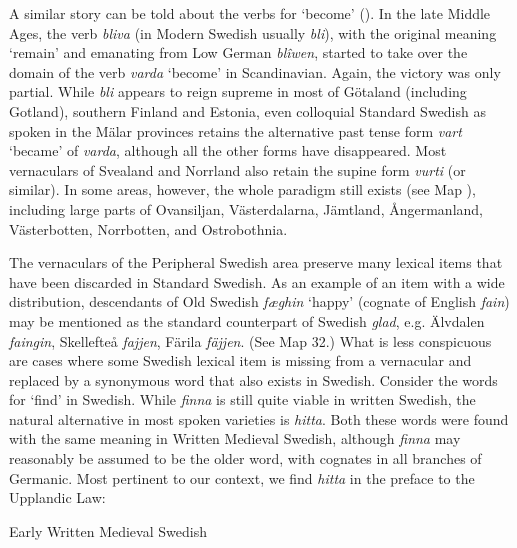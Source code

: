 \begin{styleBodytextC}
A similar story can be told about the verbs for ‘become’ (\citet{Markey1969}). In the late Middle Ages, the verb \textit{bliva }(in Modern Swedish usually \textit{bli}), with the original meaning ‘remain’ and emanating from Low German \textit{blîwen}, started to take over the domain of the verb \textit{varda} ‘become’ in Scandinavian. Again, the victory was only partial. While \textit{bli }appears to reign supreme in most of Götaland (including Gotland), southern Finland and Estonia, even colloquial Standard Swedish as spoken in the Mälar provinces retains the alternative past tense form \textit{vart} ‘became’ of \textit{varda}, although all the other forms have disappeared. Most vernaculars of Svealand and Norrland also retain the supine form \textit{vurti} (or similar). In some areas, however, the whole paradigm still exists (see Map ), including large parts of Ovansiljan, Västerdalarna, Jämtland, Ångermanland, Västerbotten, Norrbotten, and Ostrobothnia.

\end{styleBodytextC}

\begin{styleBodytextC}
The vernaculars of the Peripheral Swedish area preserve many lexical items that have been discarded in Standard Swedish. As an example of an item with a wide distribution, descendants of Old Swedish \textit{fæghin }‘happy’ (cognate of English \textit{fain}) may be mentioned as the standard counterpart of Swedish \textit{glad}, e.g. Älvdalen \textit{faingin}, Skellefteå \textit{fajjen}, Färila \textit{fäjjen}. (See Map 32.) What is less conspicuous are cases where some Swedish lexical item is missing from a vernacular and replaced by a synonymous word that also exists in Swedish. Consider the words for ‘find’ in Swedish. While \textit{finna }is still quite viable in written Swedish, the natural alternative in most spoken varieties is \textit{hitta}. Both these words were found with the same meaning in Written Medieval Swedish, although \textit{finna} may reasonably be assumed to be the older word, with cognates in all branches of Germanic. Most pertinent to our context, we find \textit{hitta} in the preface to the Upplandic Law:

\end{styleBodytextC}

\begin{listWWNumileveli}
\item {}

\begin{styleExample}
Early Written Medieval Swedish

\end{styleExample}

\end{listWWNumileveli}

